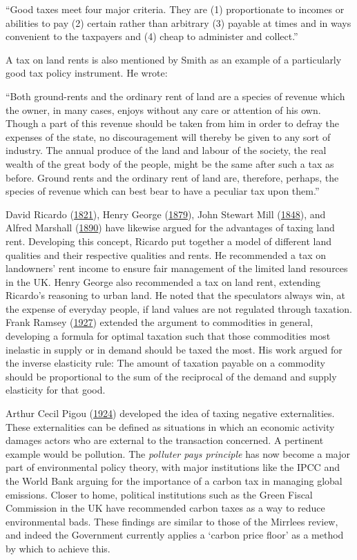 \documentclass[]{tufte-handout}
\begin{document}
``Good taxes meet four major criteria. They are (1) proportionate to
incomes or abilities to pay (2) certain rather than arbitrary (3)
payable at times and in ways convenient to the taxpayers and (4) cheap
to administer and collect.''

A tax on land rents is also mentioned by Smith as an example of a
particularly good tax policy instrument. He wrote:

``Both ground-rents and the ordinary rent of land are a species of
revenue which the owner, in many cases, enjoys without any care or
attention of his own. Though a part of this revenue should be taken from
him in order to defray the expenses of the state, no discouragement will
thereby be given to any sort of industry. The annual produce of the land
and labour of the society, the real wealth of the great body of the
people, might be the same after such a tax as before. Ground rents and
the ordinary rent of land are, therefore, perhaps, the species of
revenue which can best bear to have a peculiar tax upon them.''

David Ricardo (\protect\hyperlink{ref-ricardo1821principles}{1821}),
Henry George (\protect\hyperlink{ref-George1879}{1879}), John Stewart
Mill (\protect\hyperlink{ref-mill1848principles}{1848}), and Alfred
Marshall (\protect\hyperlink{ref-marshall1890principles}{1890}) have
likewise argued for the advantages of taxing land rent. Developing this
concept, Ricardo put together a model of different land qualities and
their respective qualities and rents. He recommended a tax on
landowners' rent income to ensure fair management of the limited land
resources in the UK. Henry George also recommended a tax on land rent,
extending Ricardo's reasoning to urban land. He noted that the
speculators always win, at the expense of everyday people, if land
values are not regulated through taxation. Frank Ramsey
(\protect\hyperlink{ref-Ramsey1927}{1927}) extended the argument to
commodities in general, developing a formula for optimal taxation such
that those commodities most inelastic in supply or in demand should be
taxed the most. His work argued for the inverse elasticity rule: The
amount of taxation payable on a commodity should be proportional to the
sum of the reciprocal of the demand and supply elasticity for that good.

Arthur Cecil Pigou (\protect\hyperlink{ref-Pigou1924}{1924}) developed
the idea of taxing negative externalities. These externalities can be
defined as situations in which an economic activity damages actors who
are external to the transaction concerned. A pertinent example would be
pollution. The \emph{polluter pays principle} has now become a major
part of environmental policy theory, with major institutions like the
IPCC and the World Bank arguing for the importance of a carbon tax in
managing global emissions. Closer to home, political institutions such
as the Green Fiscal Commission in the UK have recommended carbon taxes
as a way to reduce environmental bads. These findings are similar to
those of the Mirrlees review, and indeed the Government currently
applies a `carbon price floor' as a method by which to achieve this.
\end{document}
